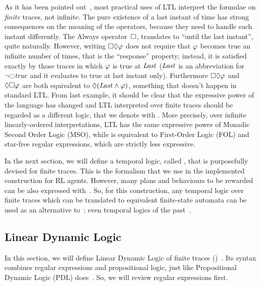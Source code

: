 As it has been pointed out~\cite{bib:ltlf-ldlf}, most practical uses of LTL
interpret the formulae on \emph{finite} traces, not infinite. The pure
existence of a last instant of time has strong consequences on the meaning of
the operators, because they need to handle such instant differently. The
Always operator~$\square$, translates to ``until the last instant'', quite
naturally. However, writing $\square\lozenge \varphi$ does not require
that $\varphi$ becomes true an infinite number of times, that is the
``response'' property; instead, it is satisfied exactly by those traces in
which $\varphi$ is true at $\text{\textit{Last}}$ ($\text{\textit{Last}}$ is an abbreviation
for $\lnot \next \true$ and it evaluates to true at last instant only).
Furthermore $\square\lozenge \varphi$ and $\lozenge\square \varphi$
are both equivalent to $\lozenge (\text{\textit{Last}} \land \varphi)$, something
that doesn't happen in standard LTL. From last example, it should be clear
that the expressive power of the language has changed and LTL interpreted over
finite traces should be regarded as a different logic, that we denote with
\ltl{}. More precisely, over infinite linearly-ordered interpretations, LTL
has the same expressive power of Monadic Second Order Logic (MSO), while
\ltl{} is equivalent to First-Order Logic (FOL) and star-free regular
expressions, which are strictly less expressive.

In the next section, we will define a temporal logic, called \ldl{}, that is
purposefully devised for finite traces. This is the formalism that we use in
the implemented construction for RL agents. However, many plans and behaviours
to be rewarded can be also expressed with~\ltl{}. So, for this construction,
any temporal logic over finite traces which can be translated to equivalent
finite-state automata can be used as an alternative to~\ldl{}; even temporal
logics of the past~\cite{bib:nmrdp-logic-first}.


\subsection{Linear Dynamic Logic}

In this section, we will define Linear Dynamic Logic of finite traces
(\ldl{})~\cite{bib:ltlf-ldlf}. Its syntax combines regular expressions and
propositional logic, just like Propositional Dynamic Logic (PDL)
does~\cite{bib:pdl}\cite{bib:pdl-stanford}. So, we will review regular
expressions first.


